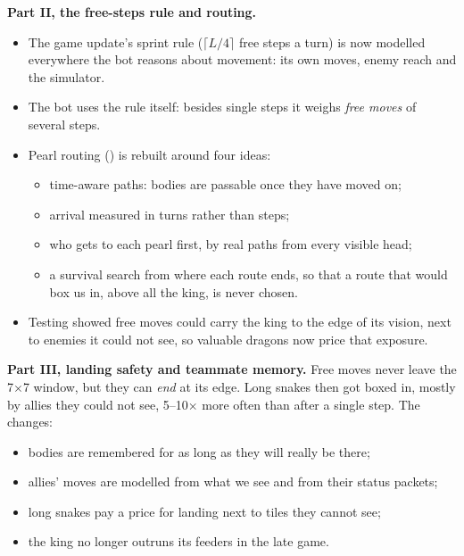 \documentclass[11pt,a4paper]{article}
\newcommand{\code}[1]{\texttt{\detokenize{#1}}}
\begin{document}
\textbf{Part II, the free-steps rule and routing.}
\begin{itemize}
  \item The game update's sprint rule ($\lceil L/4\rceil$ free steps a turn) is now modelled everywhere the bot
        reasons about movement: its own moves, enemy reach and the simulator.
  \item The bot uses the rule itself: besides single steps it weighs \emph{free moves} of several steps.
  \item Pearl routing (\code{route.hpp}) is rebuilt around four ideas:
        \begin{itemize}
          \item time-aware paths: bodies are passable once they have moved on;
          \item arrival measured in turns rather than steps;
          \item who gets to each pearl first, by real paths from every visible head;
          \item a survival search from where each route ends, so that a route that would box us in, above
                all the king, is never chosen.
        \end{itemize}
  \item Testing showed free moves could carry the king to the edge of its vision, next to enemies it could not see,
        so valuable dragons now price that exposure.
\end{itemize}
\textbf{Part III, landing safety and teammate memory.} Free moves never leave the 7$\times$7 window, but they can
\emph{end} at its edge. Long snakes then got boxed in, mostly by allies they could not see, 5--10$\times$ more often than
after a single step. The changes:
\begin{itemize}
  \item bodies are remembered for as long as they will really be there;
  \item allies' moves are modelled from what we see and from their status packets;
  \item long snakes pay a price for landing next to tiles they cannot see;
  \item the king no longer outruns its feeders in the late game.
\end{itemize}
\end{document}
